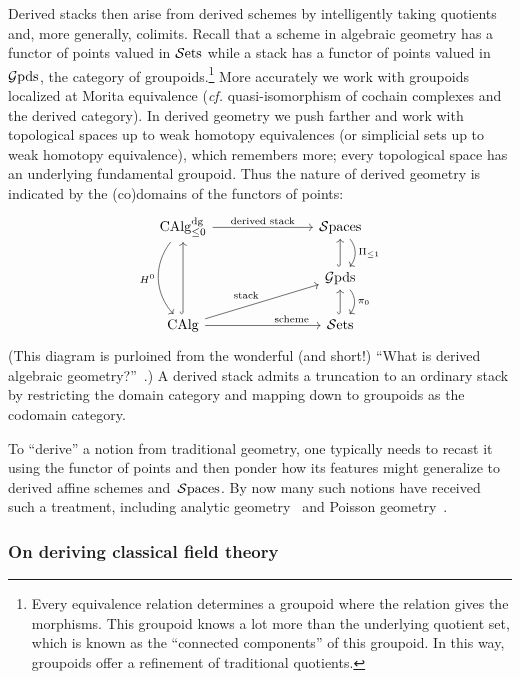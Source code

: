 \documentclass[11pt]{amsart}
\begin{document}
Derived stacks then arise from derived schemes by intelligently taking quotients and, more generally, colimits.
Recall that a scheme in algebraic geometry has a functor of points valued in $\mathcal S{\rm ets}$ while a stack has a functor of points valued in $\mathcal G{\rm pds}$, 
the category of groupoids.\footnote{Every equivalence relation determines a groupoid where the relation gives the morphisms. This groupoid knows a lot more than the underlying quotient set, which is known as the ``connected components'' of this groupoid. In this way, groupoids offer a refinement of traditional quotients.}
More accurately we work with groupoids localized at Morita equivalence ({\it cf.} quasi-isomorphism of cochain complexes and the derived category).
In derived geometry we push farther and work with topological spaces up to weak homotopy equivalences (or simplicial sets up to weak homotopy equivalence),
which remembers more;
every topological space has an underlying fundamental groupoid.
Thus the nature of derived geometry is indicated by the (co)domains of the functors of points:
\[
\begin{tikzcd}[column sep=large]
\CAlg^{\dg}_{\leq 0} \arrow[dd, bend right=40, "H^0"'] \arrow[rr, "\text{derived stack}"] & & \Spaces \arrow[d, bend left=40, "\Pi_{\leq 1}"]\\
&& \Gpds \arrow[d, bend left=40,  "\pi_0"] \arrow[u, hook]\\
\CAlg \arrow[uu, hook] \arrow[rr, "\text{scheme}" near end] \arrow[urr, "\text{stack}"] && \Sets \arrow[u, hook]
\end{tikzcd}
\]
(This diagram is purloined from the wonderful (and short!) ``What is derived algebraic geometry?''~\cite{VezAMS}.)
A derived stack admits a truncation to an ordinary stack by restricting the domain category and mapping down to groupoids as the codomain category.

To ``derive'' a notion from traditional geometry, one typically needs to recast it using the functor of points and then ponder how its features might generalize to derived affine schemes and~$\mathcal S{\rm paces}$.
By now many such notions have received such a treatment, including analytic geometry~\cite{} and Poisson geometry~\cite{}.

\subsubsection{On deriving classical field theory}
\end{document}
